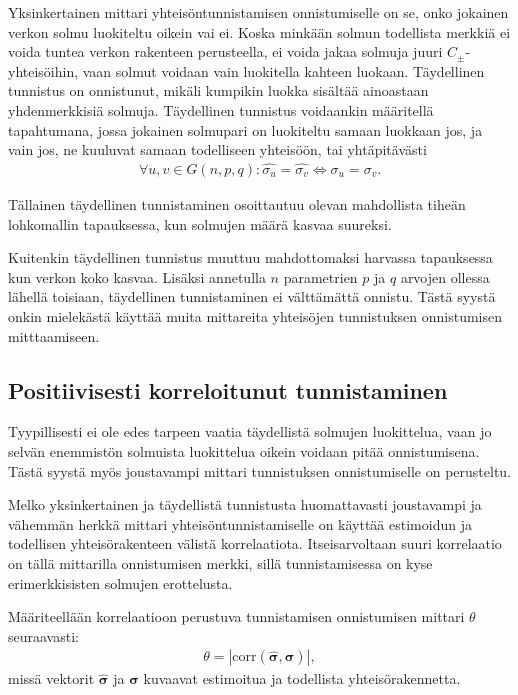 \documentclass[finnish,12pt,a4paper,pdftex,sci,utf8]{aaltothesis}
\begin{document}
Yksinkertainen mittari yhteisöntunnistamisen onnistumiselle on se, onko jokainen verkon solmu luokiteltu oikein vai ei. Koska minkään solmun todellista merkkiä ei voida tuntea verkon rakenteen perusteella, ei voida jakaa solmuja juuri $C_{\pm}$-yhteisöihin, vaan solmut voidaan vain luokitella kahteen luokaan. Täydellinen tunnistus on onnistunut, mikäli kumpikin luokka sisältää ainoastaan yhdenmerkkisiä solmuja. Täydellinen tunnistus voidaankin määritellä tapahtumana, jossa jokainen solmupari on luokiteltu samaan luokkaan jos, ja vain jos, ne kuuluvat samaan todelliseen yhteisöön, tai yhtäpitävästi
\begin{align*}
	\forall u,v \in G(n,p,q) : \hat{\sigma_u} = \hat{\sigma_v} \Leftrightarrow \sigma_u = \sigma_v.
\end{align*}

Tällainen täydellinen tunnistaminen osoittautuu olevan mahdollista tiheän lohkomallin tapauksessa, kun solmujen määrä kasvaa suureksi.

Kuitenkin täydellinen tunnistus muuttuu mahdottomaksi harvassa tapauksessa kun verkon koko kasvaa. Lisäksi annetulla $n$ parametrien $p$ ja $q$ arvojen ollessa lähellä toisiaan, täydellinen tunnistaminen ei välttämättä onnistu. Tästä syystä onkin mielekästä käyttää muita mittareita yhteisöjen tunnistuksen onnistumisen mitttaamiseen.

\subsection{Positiivisesti korreloitunut tunnistaminen}
Tyypillisesti ei ole edes tarpeen vaatia täydellistä solmujen luokittelua, vaan jo selvän enemmistön solmuista luokittelua oikein voidaan pitää onnistumisena. Tästä syystä myös joustavampi mittari tunnistuksen onnistumiselle on perusteltu.

Melko yksinkertainen ja täydellistä tunnistusta huomattavasti joustavampi ja vähemmän herkkä mittari yhteisöntunnistamiselle on käyttää estimoidun ja todellisen yhteisörakenteen välistä korrelaatiota. Itseisarvoltaan suuri korrelaatio on tällä mittarilla onnistumisen merkki, sillä tunnistamisessa on kyse erimerkkisisten solmujen erottelusta.

Määriteellään korrelaatioon perustuva tunnistamisen onnistumisen mittari $\theta$ seuraavasti:
\begin{align*}
	\theta = \left| \text{corr}(\hat{\mathbf{{\sigma}}}, \mathbf{\sigma}) \right|,
\end{align*}
missä vektorit $\hat{\mathbf{\sigma}}$ ja $\mathbf{\sigma}$ kuvaavat estimoitua ja todellista yhteisörakennetta.
\end{document}
